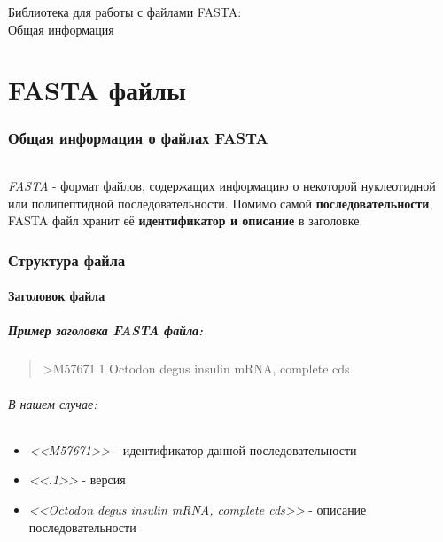 \documentclass{article}
\begin{document}
    \begin{titlepage}
        \newpage
            \begin{center}
                \Large Библиотека для работы с файлами FASTA:\\
                Общая информация
            \end{center}
    \end{titlepage}
    
    \part{FASTA файлы}
        \section{Общая информация о файлах FASTA}
            \paragraph{}
                    \emph{FASTA} - формат файлов, содержащих информацию о некоторой нуклеотидной или полипептидной последовательности.
                    Помимо самой \textbf{последовательности}, FASTA файл хранит её \textbf{идентификатор и описание} в заголовке.
        \section {Структура файла}
            \subsection{Заголовок файла}
                \subsubsection{Пример заголовка FASTA файла:}
                    \begin{quote}
                        >M57671.1 Octodon degus insulin mRNA, complete cds
                    \end{quote}
                    \paragraph{В нашем случае:}
                        \begin{itemize}
                          \item \emph{<<M57671>>} - идентификатор данной последовательности
                          \item \emph{<<.1>>} - версия
                          \item \emph{<<Octodon degus insulin mRNA, complete cds>>} - описание последовательности
                        \end{itemize}
\end{document}
